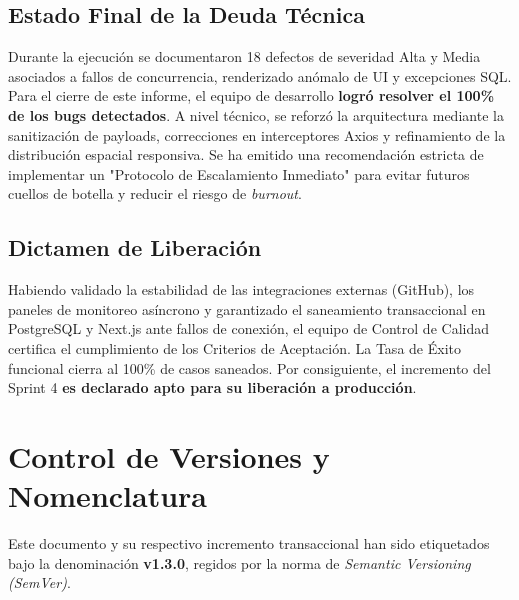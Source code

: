 \subsection{Estado Final de la Deuda Técnica}
Durante la ejecución se documentaron 18 defectos de severidad Alta y Media asociados a fallos de concurrencia, renderizado anómalo de UI y excepciones SQL. Para el cierre de este informe, el equipo de desarrollo \textbf{logró resolver el 100\% de los bugs detectados}. A nivel técnico, se reforzó la arquitectura mediante la sanitización de payloads, correcciones en interceptores Axios y refinamiento de la distribución espacial responsiva. Se ha emitido una recomendación estricta de implementar un "Protocolo de Escalamiento Inmediato" para evitar futuros cuellos de botella y reducir el riesgo de \textit{burnout}.

\subsection{Dictamen de Liberación}
\begin{tcolorbox}[colback=white, colframe=bgPass, boxrule=1.2pt, arc=2pt, title={\faCheckCircle\ \textbf{DICTAMEN: SPRINT EXITOSO Y ESTABILIZADO}}, coltitle=bgPass, fonttitle=\sffamily, attach title to upper=\par\vspace{0.2em}]
\sffamily
Habiendo validado la estabilidad de las integraciones externas (GitHub), los paneles de monitoreo asíncrono y garantizado el saneamiento transaccional en PostgreSQL y Next.js ante fallos de conexión, el equipo de Control de Calidad certifica el cumplimiento de los Criterios de Aceptación. La Tasa de Éxito funcional cierra al 100\% de casos saneados. Por consiguiente, el incremento del Sprint 4 \textbf{es declarado apto para su liberación a producción}.
\end{tcolorbox}

\section{Control de Versiones y Nomenclatura}
\label{sec:versioning_sp4}

Este documento y su respectivo incremento transaccional han sido etiquetados bajo la denominación \textbf{v1.3.0}, regidos por la norma de \textit{Semantic Versioning (SemVer)}.

